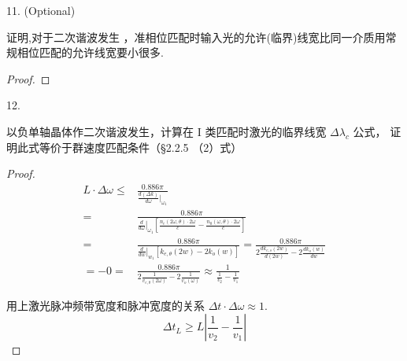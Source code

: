 \begin{exercise}

11. (Optional)

证明,对于二次谐波发生 ，准相位匹配时输入光的允许(临界)线宽比同一介质用常规相位匹配的允许线宽要小很多.
\end{exercise}

\begin{proof}

\end{proof}

\begin{exercise}

12. 

以负单轴晶体作二次谐波发生，计算在 I 类匹配时激光的临界线宽 $\Delta \lambda_c$ 公式，
证明此式等价于群速度匹配条件（§2.2.5 （2）式）
\end{exercise}

\begin{proof}

$$
\begin{aligned}
L\cdot \Delta \omega \leq& \frac{0.886 \pi}{ \frac{d(\Delta k)}{d\omega}|_{\omega_1}}\\
=&\frac{0.886 \pi}{\left.\frac{d}{d \omega}\right|_{\omega_{1}}\left[\frac{n_{e}(2 \omega, \theta) \cdot 2 \omega}{c}-\frac{n_{0}(\omega, \theta) \cdot 2 \omega}{c}\right]}\\
=&\frac{0.886 \pi}{\left.\frac{d}{d w}\right|_{w_{1}}\left[k_{e,\theta}\left(2w\right)-2 k_{o}(w)\right]}=\frac{0.886 \pi}{2 \frac{d k_{e, s}(2 w)}{d(2 w)}-2 \frac{d{k_{o}(w)}}{d w}}\\=-0 
=&\frac{0.886 \pi}{2 \frac{1}{v_{e, \theta}(2 \omega)}-2 \frac{1}{v_{o}(\omega)}} \approx \frac{1}{\frac{1}{v_{2}}-\frac{1}{v_{1}}}
\end{aligned}$$

用上激光脉冲频带宽度和脉冲宽度的关系 $\Delta t \cdot \Delta \omega\approx 1$.
$$
\Delta t_{L} \geqslant L\left|\frac{1}{v_2}-\frac{1}{v_{1}}\right|
$$
\end{proof}